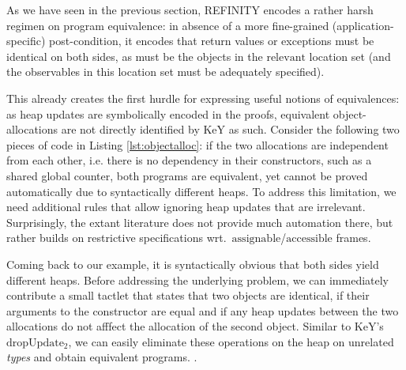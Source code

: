 \newcommand\relevant{$\mathrm{relevant}$}
\newcommand\assignable{$\mathrm{assignable}$}
\newcommand\accessible{$\mathrm{accessible}$}
\newcommand\keyrule[1]{\ensuremath{\mathrm{#1}}}

As we have seen in the previous section, REFINITY encodes a rather harsh regimen on program equivalence:
in absence of a more fine-grained (application-specific) post-condition, it encodes that return values or exceptions must be identical on both sides,
as must be the objects in the \relevant{} location set (and the observables in this location set must be adequately specified).

This already creates the first hurdle for expressing useful notions of equivalences: as heap updates are symbolically encoded in the proofs, equivalent object-allocations are not directly identified by KeY as such.
Consider the following two pieces of code in Listing \ref{lst:objectalloc}:
if the two allocations are independent from each other, i.e. there is no dependency in their constructors, such as a shared global counter,
both programs are equivalent, yet cannot be proved automatically due to syntactically different heaps.
To address this limitation, we need additional rules that allow ignoring heap updates that are irrelevant.
Surprisingly, the extant literature does not provide much automation there, but rather builds on restrictive specifications wrt.\ \assignable{}/\accessible{} frames.

Coming back to our example, it is syntactically obvious that both sides yield different heaps.
Before addressing the underlying problem, 
we can immediately contribute a small tactlet that states that two objects are identical, if their arguments to the constructor are equal and if any heap updates between the two allocations do not afffect the allocation of the second object.
Similar to KeY's \keyrule{dropUpdate_2}, we can easily eliminate these operations on the heap on unrelated \textit{types} and obtain equivalent programs.
.

